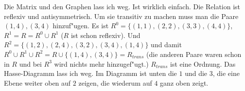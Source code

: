 \begin{loesung}
Die Matrix und den Graphen lass ich weg. Ist wirklich einfach.
Die Relation ist reflexiv und antisymmetrisch.
Um sie transitiv zu machen muss man die Paare $(1,4),(3,4)$ hinzuf"ugen.
Es ist $R^0=\{(1,1),(2,2),(3,3),(4,4)\}$, $R^1=R=R^0\cup R^1$ ($R$ ist schon reflexiv). Und $R^2=\{(1,2),(2,4),(3,2),(3,4),(1,4)\}$ und damit $R^0\cup R^1\cup R^2=R\cup\{(1,4),(3,4)\}=R_{trans}$ (die anderen Paare waren schon in $R$ und bei $R^3$ wird nichts mehr hinzugef"ugt.)
$R_{trans}$ ist eine Ordnung. Das Hasse-Diagramm lass ich weg. Im Diagramm ist unten die $1$ und die $3$, die eine Ebene weiter oben auf $2$ zeigen, die wiederum auf $4$ ganz oben zeigt.
\end{loesung}

